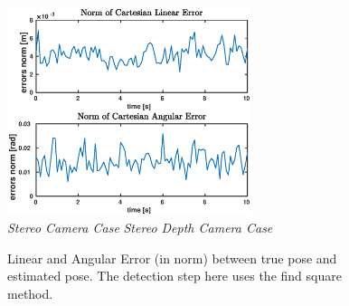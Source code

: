 \begin{figure}
	\includegraphics[width=7.15cm]{tracking/square-depth.eps}\\
	\hspace*{20px}\textit{Stereo Camera Case} \hspace{75px} \textit{Stereo Depth Camera Case}\\
	\vspace{30px}
	\caption[Tracking error plots with find square detection initialization]{Linear and Angular Error (in norm) between true pose and estimated pose. The detection step here uses the find square method.}
	\label{fig:squareErrors}
\end{figure}

